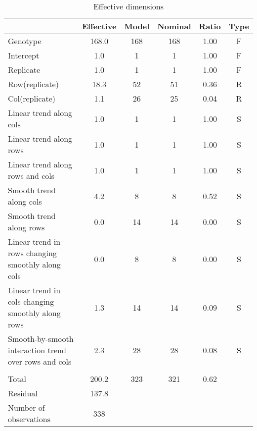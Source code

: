 \documentclass[a4paper,11pt]{article}\usepackage[]{graphicx}\usepackage[]{color}
\begin{document}
\newpage
\begin{table}[ht]
\begin{flushleft}
\caption{Effective dimensions} 
\label{effDims}
\begin{tabular}{lccccc}
  \hline
 & Effective & Model & Nominal & Ratio & Type \\ 
  \hline
Genotype & 168.0 & 168 & 168 & 1.00 & F \\ 
  Intercept & 1.0 & 1 & 1 & 1.00 & F \\ 
  Replicate & 1.0 & 1 & 1 & 1.00 & F \\ 
  Row(replicate) & 18.3 & 52 & 51 & 0.36 & R \\ 
  Col(replicate) & 1.1 & 26 & 25 & 0.04 & R \\ 
  Linear trend along cols & 1.0 & 1 & 1 & 1.00 & S \\ 
  Linear trend along rows & 1.0 & 1 & 1 & 1.00 & S \\ 
  Linear trend along rows and cols & 1.0 & 1 & 1 & 1.00 & S \\ 
  Smooth trend along cols & 4.2 & 8 & 8 & 0.52 & S \\ 
  Smooth trend along rows & 0.0 & 14 & 14 & 0.00 & S \\ 
  Linear trend in rows changing smoothly along cols & 0.0 & 8 & 8 & 0.00 & S \\ 
  Linear trend in cols changing smoothly along rows & 1.3 & 14 & 14 & 0.09 & S \\ 
  Smooth-by-smooth interaction trend over rows and cols & 2.3 & 28 & 28 & 0.08 & S \\ 
   &  &  &  &  &  \\ 
  Total & 200.2 & 323 & 321 & 0.62 &  \\ 
  Residual & 137.8 &  &  &  &  \\ 
  Number of observations & 338 &  &  &  &  \\ 
   \hline
\end{tabular}
\end{flushleft}
\end{table}
\end{document}
